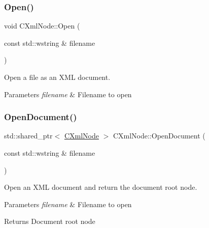 \subsubsection{\texorpdfstring{Open()}{Open()}}
{\footnotesize\ttfamily void C\+Xml\+Node\+::\+Open (\begin{DoxyParamCaption}\item[{const std\+::wstring \&}]{filename }\end{DoxyParamCaption})}



Open a file as an X\+ML document. 


\begin{DoxyParams}{Parameters}
{\em filename} & Filename to open \\
\hline
\end{DoxyParams}
\mbox{\label{classxmlnode_1_1_c_xml_node_ad71ff87937ae943a9c11f5891d53d93b}} 
\subsubsection{\texorpdfstring{Open\+Document()}{OpenDocument()}}
{\footnotesize\ttfamily std\+::shared\+\_\+ptr$<$ \mbox{\hyperlink{classxmlnode_1_1_c_xml_node}{C\+Xml\+Node}} $>$ C\+Xml\+Node\+::\+Open\+Document (\begin{DoxyParamCaption}\item[{const std\+::wstring \&}]{filename }\end{DoxyParamCaption})\hspace{0.3cm}{\ttfamily [static]}}



Open an X\+ML document and return the document root node. 


\begin{DoxyParams}{Parameters}
{\em filename} & Filename to open \\
\hline
\end{DoxyParams}
\begin{DoxyReturn}{Returns}
Document root node 
\end{DoxyReturn}
\mbox{\label{classxmlnode_1_1_c_xml_node_a0f83eef381fe59726503e0fcb854661d}} 
